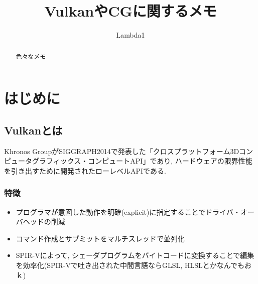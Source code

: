 \documentclass{suribt}
\title{VulkanやCGに関するメモ}
\author{Lambda1}
\begin{document}
\maketitle
\frontmatter

\begin{abstract}
	色々なメモ
\end{abstract}

\tableofcontents

\mainmatter
\chapter{はじめに}\label{chap:1}
\section{Vulkanとは}
	Khronos GroupがSIGGRAPH2014で発表した「クロスプラットフォーム3Dコンピュータグラフィックス・コンピュートAPI」であり, ハードウェアの限界性能を引き出すために開発されたローレベルAPIである.
\subsection{特徴}
\begin{itemize}
	\item プログラマが意図した動作を明確(explicit)に指定することでドライバ・オーバヘッドの削減
	\item コマンド作成とサブミットをマルチスレッドで並列化
	\item SPIR-Vによって, シェーダプログラムをバイトコードに変換することで編集を効率化(SPIR-Vで吐き出された中間言語ならGLSL, HLSLとかなんでもおｋ)
\end{itemize}
\newpage
\end{document}
